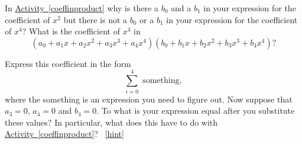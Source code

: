 \documentclass{book}
\begin{document}
\setcounter{project}{246}
\addtocounter{project}{-1}
\begin{activity}[]\label{coeffinproduct1}
\hypertarget{p-1326}{}%
In \hyperref[coeffinproduct]{Activity~\ref{coeffinproduct}} why is there a \(b_0\) and a \(b_1\) in your expression for the coefficient of \(x^2\) but there is not a \(b_0\) or a \(b_1\) in your expression for the coefficient of \(x^4\)? What is the coefficient of \(x^4\) in%
\begin{equation*}
(a_0+a_1x+a_2x^2+a_3x^3+a_4x^4)(b_0+b_1x+b_2x^2
+b_3x^3+b_4x^4)?
\end{equation*}
%
\par
\hypertarget{p-1327}{}%
Express this coefficient in the form%
\begin{equation*}
\sum_{i=0}^4 \mbox{ something} ,
\end{equation*}
where the something is an expression you need to figure out. Now suppose that \(a_3=0\), \(a_4=0\) and \(b_4=0\). To what is your expression equal after you substitute these values? In particular, what does this have to do with \hyperref[coeffinproduct]{Activity~\ref{coeffinproduct}}?%
~\hfill{\tiny\hyperlink{a-246}{[hint]}\hypertarget{q-246}{}}\end{activity}
\end{document}
